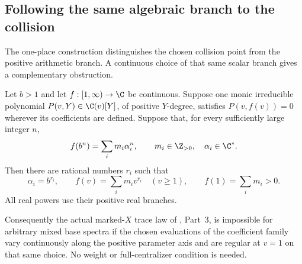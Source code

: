 \subsection{Following the same algebraic branch to the collision}
The one-place construction distinguishes the chosen collision point
from the positive arithmetic branch. A continuous choice of that
same scalar branch gives a complementary obstruction.

\begin{finding}
\label{f:continuoustracebranch}
Let $b>1$ and let $f:[1,\infty)\to\C$ be continuous.
Suppose one monic irreducible polynomial
$P(v,Y)\in\C(v)[Y]$, of positive $Y$-degree, satisfies
$P(v,f(v))=0$ wherever its coefficients are defined.
Suppose that, for every sufficiently large integer $n$,
\[
 f(b^n)=\sum_i m_i\alpha_i^n,
 \qquad m_i\in\Z_{>0},\quad \alpha_i\in\C^*.
\]
Then there are rational numbers $r_i$ such that
\begin{equation}\label{eq:continuoustracepositive}
 \alpha_i=b^{r_i},\qquad
 f(v)=\sum_i m_i v^{r_i}\quad(v\ge1),\qquad
 f(1)=\sum_i m_i>0.
\end{equation}
All real powers use their positive real branches.

Consequently the actual marked-$X$ trace law of
, Part~3, is impossible for arbitrary mixed
base spectra if the chosen evaluations of the coefficient
family vary continuously along the positive parameter
axis and are regular at $v=1$ on that same choice.
No weight or full-centralizer condition is needed.
\end{finding}

